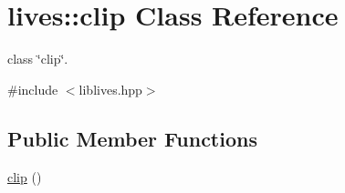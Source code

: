\hypertarget{classlives_1_1clip}{\section{lives\-:\-:clip Class Reference}
\label{classlives_1_1clip}
}


class \char`\"{}clip\char`\"{}.  




{\ttfamily \#include $<$liblives.\-hpp$>$}

\subsection*{Public Member Functions}
\begin{DoxyCompactItemize}
\item 
\hypertarget{classlives_1_1clip_a8ec807cbd20bb024f61d948380aaf3ee}{\hyperlink{classlives_1_1clip_a8ec807cbd20bb024f61d948380aaf3ee}{clip} ()}\label{classlives_1_1clip_a8ec807cbd20bb024f61d948380aaf3ee}


\end{DoxyCompactItemize}
